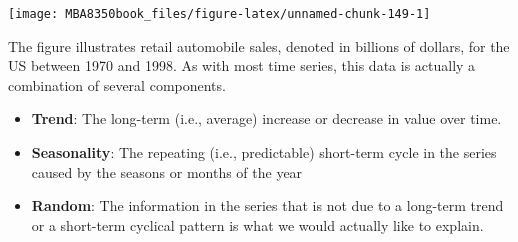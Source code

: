 \documentclass[
]{book}
\newenvironment{Shaded}{\begin{snugshade}}{\end{snugshade}}
\newcommand{\AttributeTok}[1]{\textcolor[rgb]{0.77,0.63,0.00}{#1}}
\newcommand{\ConstantTok}[1]{\textcolor[rgb]{0.00,0.00,0.00}{#1}}
\newcommand{\DecValTok}[1]{\textcolor[rgb]{0.00,0.00,0.81}{#1}}
\newcommand{\FunctionTok}[1]{\textcolor[rgb]{0.00,0.00,0.00}{#1}}
\newcommand{\NormalTok}[1]{#1}
\newcommand{\OtherTok}[1]{\textcolor[rgb]{0.56,0.35,0.01}{#1}}
\newcommand{\SpecialCharTok}[1]{\textcolor[rgb]{0.00,0.00,0.00}{#1}}
\newcommand{\StringTok}[1]{\textcolor[rgb]{0.31,0.60,0.02}{#1}}
\begin{document}
\begin{Shaded}
\end{Shaded}

\begin{center}\texttt{[image: MBA8350book\_files/figure-latex/unnamed-chunk-149-1]} \end{center}

The figure illustrates retail automobile sales, denoted in billions of dollars, for the US between 1970 and 1998. As with most time series, this data is actually a combination of several components.

\begin{itemize}
\item
  \textbf{Trend}: The long-term (i.e., average) increase or decrease in value over time.
\item
  \textbf{Seasonality}: The repeating (i.e., predictable) short-term cycle in the series caused by the seasons or months of the year
\item
  \textbf{Random}: The information in the series that is not due to a long-term trend or a short-term cyclical pattern is what we would actually like to explain.
\end{itemize}
\end{document}
